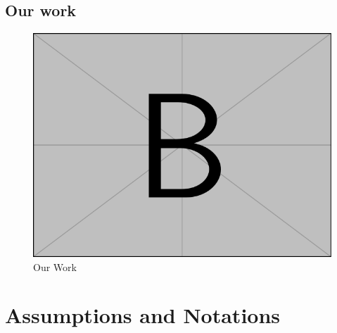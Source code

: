 \documentclass[12pt]{ctexart}
\begin{document}
\subsection{Our work}%
\begin{figure}[htbp]
	\centering
	\includegraphics[height=8\baselineskip]{example-image-b.pdf}
	\caption{Our Work}
	\vspace{-20pt}
\end{figure}

\section{Assumptions and Notations}
\vspace{0pt}


\end{document}
